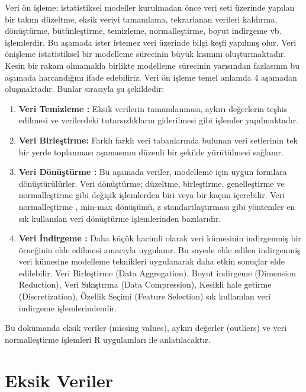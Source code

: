 \documentclass[
  letterpaper,
  DIV=11,
  numbers=noendperiod]{scrreprt}
\begin{document}

Veri ön işleme; istatistiksel modeller kurulmadan önce veri seti
üzerinde yapılan bir takım düzeltme, eksik veriyi tamamlama, tekrarlanan
verileri kaldırma, dönüştürme, bütünleştirme, temizleme, normalleştirme,
boyut indirgeme vb. işlemlerdir. Bu aşamada ister istemez veri üzerinde
bilgi keşfi yapılmış olur. Veri önişleme istatistiksel bir modelleme
sürecinin büyük kısmını oluşturmaktadır. Kesin bir rakam olmamakla
birlikte modelleme sürecinin yarısından fazlasının bu aşamada
harcandığını ifade edebiliriz. Veri ön işleme temel anlamda 4 aşamadan
oluşmaktadır. Bunlar sırasıyla şu şekildedir:

\begin{enumerate}
\def\labelenumi{\arabic{enumi}.}
\item
  \textbf{Veri Temizleme :} Eksik verilerin tamamlanması, aykırı
  değerlerin teşhis edilmesi ve verilerdeki tutarsızlıkların giderilmesi
  gibi işlemler yapılmaktadır.
\item
  \textbf{Veri Birleştirme:} Farklı farklı veri tabanlarında bulunan
  veri setlerinin tek bir yerde toplanması aşamasının düzenli bir
  şekilde yürütülmesi sağlanır.
\item
  \textbf{Veri Dönüştürme :} Bu aşamada veriler, modelleme için uygun
  formlara dönüştürülürler. Veri dönüştürme; düzeltme, birleştirme,
  genelleştirme ve normalleştirme gibi değişik işlemlerden biri veya bir
  kaçını içerebilir. Veri normalleştirme , min-max dönüşümü, z
  standartlaştırması gibi yöntemler en sık kullanılan veri dönüştürme
  işlemlerinden bazılarıdır.
\item
  \textbf{Veri İndirgeme :} Daha küçük hacimli olarak veri kümesinin
  indirgenmiş bir örneğinin elde edilmesi amacıyla uygulanır. Bu sayede
  elde edilen indirgenmiş veri kümesine modelleme teknikleri uygulanarak
  daha etkin sonuçlar elde edilebilir. Veri Birleştirme (Data
  Aggregation), Boyut indirgeme (Dimension Reduction), Veri Sıkıştırma
  (Data Compression), Kesikli hale getirme (Discretization), Özellik
  Seçimi (Feature Selection) sık kullanılan veri indirgeme
  işlemlerindendir.
\end{enumerate}

Bu dokümanda eksik veriler (missing values), aykırı değerler (outliers)
ve veri normalleştirme işlemleri R uygulamları ile anlatılacaktır.

\hypertarget{eksik-veriler}{%
\section*{Eksik Veriler}\label{eksik-veriler}}
\end{document}
